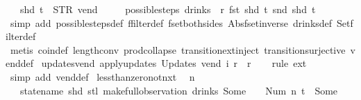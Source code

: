 \begin{isabellebody}
\ \ \ shd\ t\ {\isasymnoteq}\ {\isacharparenleft}STR\ {\isacharprime}{\isacharprime}vend{\isacharprime}{\isacharprime}{\isacharcomma}\ {\isacharbrackleft}{\isacharbrackright}{\isacharparenright}\ {\isasymLongrightarrow}\isanewline
\ \ \ possible{\isacharunderscore}steps\ drinks\ {}\ r\ {\isacharparenleft}fst\ {\isacharparenleft}shd\ t{\isacharparenright}{\isacharparenright}\ {\isacharparenleft}snd\ {\isacharparenleft}shd\ t{\isacharparenright}{\isacharparenright}\ {\isacharequal}\ {\isacharbraceleft}{\isacharbar}{\isacharbar}{\isacharbraceright}{\isachardoublequoteclose}\isanewline
%
\isadelimproof
\ \ %
\endisadelimproof
%
\isatagproof
{}\isamarkupfalse%
\ {\isacharparenleft}simp\ add{\isacharcolon}\ possible{\isacharunderscore}steps{\isacharunderscore}def\ ffilter{\isacharunderscore}def\ fset{\isacharunderscore}both{\isacharunderscore}sides\ Abs{\isacharunderscore}fset{\isacharunderscore}inverse\ drinks{\isacharunderscore}def\ Set{\isachardot}filter{\isacharunderscore}def{\isacharparenright}\isanewline
\ \ \isamarkupfalse%
\ {\isacharparenleft}metis\ coin{\isacharunderscore}def\ length{\isacharunderscore}{}{\isacharunderscore}conv\ prod{\isachardot}collapse\ transition{\isachardot}ext{\isacharunderscore}inject\ transition{\isachardot}surjective\ vend{\isacharunderscore}def{\isacharparenright}%
\endisatagproof
{\isafoldproof}%
%
\isadelimproof
\isanewline
%
\endisadelimproof
\isanewline
{}\isamarkupfalse%
\ updates{\isacharunderscore}vend{\isacharcolon}\ {\isachardoublequoteopen}apply{\isacharunderscore}updates\ {\isacharparenleft}Updates\ vend{\isacharparenright}\ i\ r\ {\isacharequal}\ r{\isachardoublequoteclose}\isanewline
%
\isadelimproof
\ \ %
\endisadelimproof
%
\isatagproof
{}\isamarkupfalse%
\ {\isacharparenleft}rule\ ext{\isacharparenright}\isanewline
\ \ \isamarkupfalse%
\ {\isacharparenleft}simp\ add{\isacharcolon}\ vend{\isacharunderscore}def{\isacharparenright}%
\endisatagproof
{\isafoldproof}%
%
\isadelimproof
\isanewline
%
\endisadelimproof
\isanewline
{}\isamarkupfalse%
\ less{\isacharunderscore}than{\isacharunderscore}zero{\isacharunderscore}not{\isacharunderscore}nxt{\isacharunderscore}{}{\isacharcolon}\isanewline
\ \ {\isachardoublequoteopen}n\ {\isasymle}\ {}\ {\isasymLongrightarrow}\isanewline
\ \ \ statename\ {\isacharparenleft}shd\ {\isacharparenleft}stl\ {\isacharparenleft}make{\isacharunderscore}full{\isacharunderscore}observation\ drinks\ {\isacharparenleft}Some\ {}{\isacharparenright}\ {\isacharless}{}\ {\isacharcolon}{\isacharequal}\ Num\ n{\isachargreater}\ t{\isacharparenright}{\isacharparenright}{\isacharparenright}\ {\isasymnoteq}\ Some\ {}{\isachardoublequoteclose}\isanewline

\end{isabellebody}

